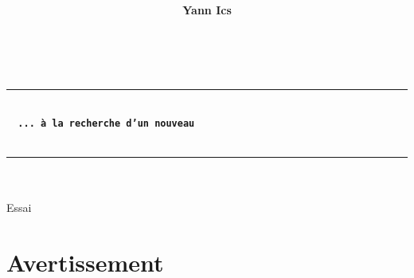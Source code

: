 \documentclass{article}
\title{%
}
\author{\textsf{\textbf{Yann Ics}}}
\date{}
\renewcommand{\contentsname}{Contents~\hfill\textbf{Line}}
\newcommand{\myulineyellow}[1]{%
  \uline{\phantom{#1}}%
  \llap{\contour{yellow!10}{#1}}%
}
\begin{document}

\makeatletter
  \begin{titlepage}
  \centering
  {\Large \@author} \\
  \rule{\linewidth}{.5pt}
  \vspace{4cm}
  
  {\LARGE \textbf{\@title}} \\
   \vspace{6 mm}
   {\color{brown} {\Large \textbf{\texttt{\, ... à la recherche d'un nouveau}}}}\\
   \vspace{2mm}
   {}\\
  \vfill
  \rule{\linewidth}{.5pt}
     {\Large \textsf{\textsl{}}}\\ 
          {\Large \textsf{\textsl{}}}\\ 

      {\Large \textsf{Essai}}\\

 \end{titlepage}
\makeatother
\setcounter{tocdepth}{1}
\renewcommand{\contentsname}{Sommaire\\}

{\color{DarkRed}\tableofcontents
\noindent\hrulefill}

\pagecolor{white}



\renewcommand\thelinenumber{\color{purple}\arabic{linenumber}}
\linenumbers
  
\section{Avertissement}
\end{document}
